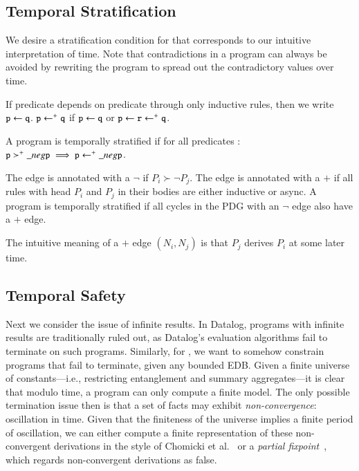 \subsection{Temporal Stratification}

We desire a stratification condition for \lang that corresponds to our
intuitive interpretation of time.  Note that contradictions in a \lang program
can always be avoided by rewriting the program to spread out the contradictory
values over time.  

If predicate  depends on predicate  through only
inductive rules, then we write $\dedalus{p} \gets \dedalus{q}$.  $\dedalus{p}
\gets^+ \dedalus{q}$ if $\dedalus{p} \gets \dedalus{q}$ or $\dedalus{p} \gets
\dedalus{r} \gets^+ \dedalus{q}$.

\begin{definition}
%
A \lang program is temporally stratified if for all predicates :
$\dedalus{p} \succ^+ \nega \dedalus{p} \implies \dedalus{p} \gets^+ \nega
\dedalus{p}$.
%
\end{definition}


The edge is annotated with a
$\lnot$ if $P_i \succ \lnot P_j$.  The
edge is annotated with a $+$ if all rules with head $P_i$ and $P_j$ in their
bodies are either inductive or async.  A \lang program is temporally
stratified if all cycles in the PDG with an $\lnot$ edge also have a $+$
edge.

The intuitive meaning of a $+$ edge $(N_i, N_j)$ is that $P_j$ derives $P_i$ at
some later time.  

\subsection{Temporal Safety}

Next we consider the issue of infinite results.  In Datalog, programs with
infinite results are traditionally ruled out, as Datalog's evaluation
algorithms fail to terminate on such programs.  Similarly, for \lang, we want
to somehow constrain programs that fail to terminate, given any bounded EDB.
Given a finite universe of constants---i.e., restricting entanglement and
summary aggregates---it is clear that modulo time, a \lang program can
only compute a finite model.  
The only possible termination issue then is that
a set of facts may exhibit {\em non-convergence}: oscillation in time.  Given
that the finiteness of the universe implies a finite period of oscillation, we
can either compute a finite representation of these non-convergent derivations
in the style of Chomicki et al.~\cite{chomicki-infinite} or a {\em partial
fixpoint}~\cite{abiteboul-vianu}, which regards non-convergent derivations as
false.

